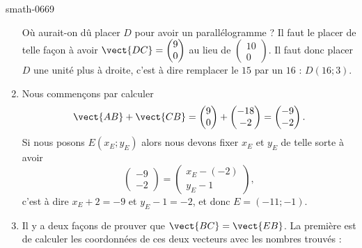 \begin{corrige}{smath-0669}
\begin{enumerate}
            Où aurait-on dû placer \( D\) pour avoir un parallélogramme ? Il faut le placer de telle façon à avoir \( \vect{ DC }=\begin{pmatrix}
                9    \\ 
                0    
            \end{pmatrix}\) au lieu de \( \begin{pmatrix}
                10    \\ 
                    0
            \end{pmatrix}\). Il faut donc placer \( D\) une unité plus à droite, c'est à dire remplacer le \( 15\) par un \( 16\) : \( D(16;3)\).
        \item
            Nous commençons par calculer 
            \begin{equation}
                \vect{ AB }+\vect{ CB }=\begin{pmatrix}
                    9    \\ 
                    0    
                \end{pmatrix}+\begin{pmatrix}
                    -18\\ 
                    -2    
                \end{pmatrix}=\begin{pmatrix}
                    -9    \\ 
                    -2    
                \end{pmatrix}.
            \end{equation}
            Si nous posons \( E(x_E;y_E)\) alors nous devons fixer \( x_E\) et \( y_E\) de telle sorte à avoir
            \begin{equation}
                \begin{pmatrix}
                    -9    \\ 
                    -2    
                \end{pmatrix}=\begin{pmatrix}
                    x_E-(-2)    \\ 
                    y_E-1    
                \end{pmatrix},
            \end{equation}
            c'est à dire \( x_E+2=-9\) et \( y_E-1=-2\), et donc \( E=(-11;-1)\).
        \item
            Il y a deux façons de prouver que \( \vect{ BC }=\vect{ EB }\). La première est de calculer les coordonnées de ces deux vecteurs avec les nombres trouvés :

\end{enumerate}
\end{corrige}
